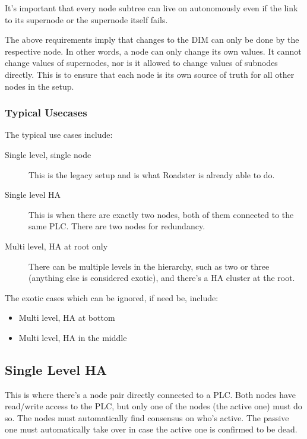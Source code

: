 It's important that every node subtree can live on autonomously even if the
link to its supernode or the supernode itself fails.

The above requirements imply that changes to the DIM can only be done by the
respective node. In other words, a node can only change its own values. It
cannot change values of supernodes, nor is it allowed to change values of
subnodes directly. This is to ensure that each node is its own source of truth
for all other nodes in the setup.


\subsubsection{Typical Usecases}
The typical use cases include:

\begin{description}
	\item [ Single level, single node ]
		This is the legacy setup and is what Roadster is already able to do.

	\item [ Single level \gls{HA} ]
		This is when there are exactly two nodes, both of them
		connected to the same PLC. There are two nodes for redundancy.

	\item [ Multi level, \gls{HA} at root only ]
		There can be multiple levels in the hierarchy, such as two or
		three (anything else is considered exotic), and there's a HA
		cluster at the root.
\end{description}

The exotic cases which can be ignored, if need be, include:

\begin{itemize}
	\item Multi level, HA at bottom
	\item Multi level, HA in the middle
\end{itemize}


\subsection{Single Level HA}
This is where there's a node pair directly connected to a PLC. Both nodes have
read\slash write access to the PLC, but only one of the nodes (the active one)
must do so. The nodes must automatically find consensus on who's active. The
passive one must automatically take over in case the active one is confirmed to
be dead.\\


